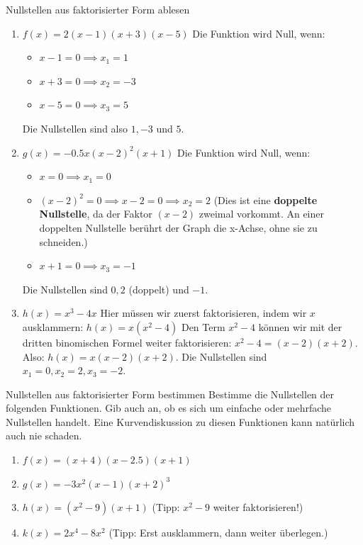 \begin{beispielumgebung}{Nullstellen aus faktorisierter Form ablesen}
\begin{enumerate}
    \item $f(x) = 2(x-1)(x+3)(x-5)$
    Die Funktion wird Null, wenn:
    \begin{itemize}
        \item $x-1=0 \implies x_1 = 1$
        \item $x+3=0 \implies x_2 = -3$
        \item $x-5=0 \implies x_3 = 5$
    \end{itemize}
    Die Nullstellen sind also $1, -3$ und $5$.

    \item $g(x) = -0.5x(x-2)^2(x+1)$
    Die Funktion wird Null, wenn:
    \begin{itemize}
        \item $x=0 \implies x_1 = 0$
        \item $(x-2)^2=0 \implies x-2=0 \implies x_2 = 2$ (Dies ist eine \textbf{doppelte Nullstelle}, da der Faktor $(x-2)$ zweimal vorkommt. An einer doppelten Nullstelle berührt der Graph die x-Achse, ohne sie zu schneiden.)
        \item $x+1=0 \implies x_3 = -1$
    \end{itemize}
    Die Nullstellen sind $0, 2$ (doppelt) und $-1$.

    \item $h(x) = x^3 - 4x$
    Hier müssen wir zuerst faktorisieren, indem wir $x$ ausklammern:
    $h(x) = x(x^2-4)$
    Den Term $x^2-4$ können wir mit der dritten binomischen Formel weiter faktorisieren: $x^2-4 = (x-2)(x+2)$.
    Also: $h(x) = x(x-2)(x+2)$.
    Die Nullstellen sind $x_1=0, x_2=2, x_3=-2$.
\end{enumerate}
\end{beispielumgebung}

\begin{aufgabenumgebung}{Nullstellen aus faktorisierter Form bestimmen}
Bestimme die Nullstellen der folgenden Funktionen. Gib auch an, ob es sich um einfache oder mehrfache Nullstellen handelt. Eine Kurvendiskussion zu diesen Funktionen kann natürlich auch nie schaden.
\begin{enumerate}
    \item $f(x) = (x+4)(x-2.5)(x+1)$
    \item $g(x) = -3x^2(x-1)(x+2)^3$
    \item $h(x) = (x^2-9)(x+1)$ (Tipp: $x^2-9$ weiter faktorisieren!)
    \item $k(x) = 2x^4 - 8x^2$ (Tipp: Erst ausklammern, dann weiter überlegen.)
\end{enumerate}
\end{aufgabenumgebung}

